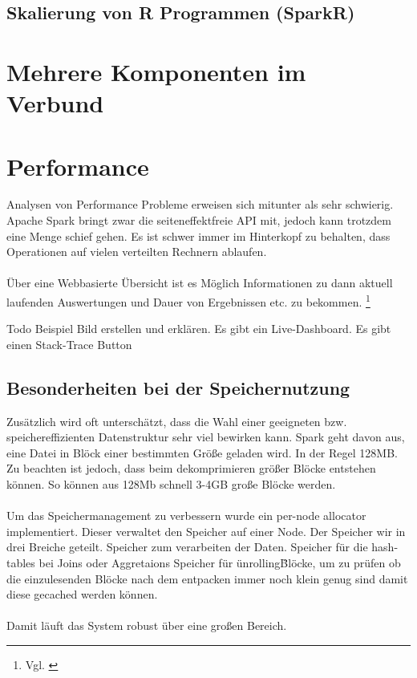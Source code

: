\subsection{Skalierung von R Programmen (SparkR)}\label{sec_sparkr}

\newpage
\section{Mehrere Komponenten im Verbund}

\newpage
\section{Performance}
Analysen von Performance Probleme erweisen sich mitunter als sehr schwierig. Apache Spark bringt zwar die seiteneffektfreie API mit, jedoch kann trotzdem eine Menge schief gehen. Es ist schwer immer im Hinterkopf zu behalten, dass Operationen auf vielen verteilten Rechnern ablaufen. \\ \\
\"Uber eine Webbasierte Übersicht ist es Möglich Informationen zu dann aktuell laufenden Auswertungen und Dauer von Ergebnissen etc. zu bekommen. \footnote{Vgl. \cite[12]{AAWS15}}

Todo Beispiel Bild erstellen und erklären.
Es gibt ein Live-Dashboard.
Es gibt einen Stack-Trace Button




\subsection{Besonderheiten bei der Speichernutzung}
Zusätzlich wird oft unterschätzt, dass die Wahl einer geeigneten bzw. speichereffizienten Datenstruktur sehr viel bewirken kann.
Spark geht davon aus, eine Datei in Blöck einer bestimmten Größe geladen wird. In der Regel 128MB. Zu beachten ist jedoch, dass beim dekomprimieren größer Blöcke entstehen können. So können aus 128Mb schnell 3-4GB große Blöcke werden. \\ \\
Um das Speichermanagement zu verbessern wurde ein per-node allocator implementiert. Dieser verwaltet den Speicher auf einer Node. 
Der Speicher wir in drei Breiche geteilt. 
Speicher zum verarbeiten der Daten.  
Speicher für die hash-tables bei Joins oder Aggretaions
Speicher für \"unrolling\" Blöcke, um zu prüfen ob die einzulesenden Blöcke nach dem entpacken immer noch klein genug sind damit diese gecached werden können.\\ \\
Damit läuft das System robust über eine großen Bereich. 

